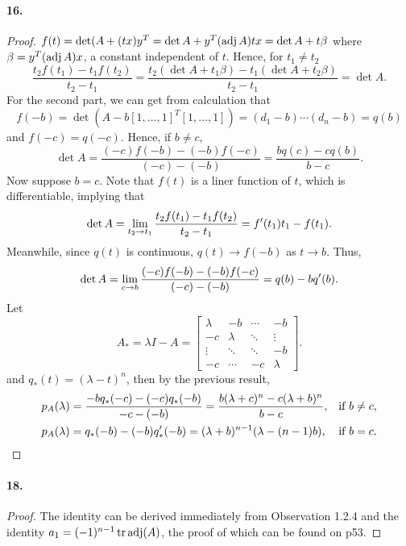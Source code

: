   \paragraph{16.}
  \begin{proof}
    $f(t)=\det(A+(tx)y^T = \det A + y^T(\operatorname{adj} A)tx = \det A + t\beta$ where 
    $\beta = y^T(\operatorname{adj} A)x$, a constant independent of $t$. Hence, for $t_1\ne
    t_2$
    \[
      \frac{t_2f(t_1)-t_1f(t_2)}{t_2-t_1} 
      = \frac{t_2(\det A + t_1\beta) - t_1(\det A + t_2\beta)}{t_2-t_1}
      = \det A.
    \]
    For the second part, we can get from calculation that
    \[
      f(-b)=\det(A-b[1,\dots,1]^T[1,\dots,1]) = (d_1-b)\cdots(d_n-b)=q(b)
    \]
    and $f(-c)=q(-c)$. Hence, if $b\ne c$,
    \[
      \det A = \frac{(-c)f(-b)- (-b)f(-c)}{(-c)-(-b)}=\frac{bq(c)-cq(b)}{b-c}.
    \]
    Now suppose $b=c$. Note that $f(t)$ is a liner function of $t$, which is 
    differentiable, implying that 
    \[
      \det A = \lim_{t_2\to t_1}\frac{t_2f(t_1)-t_1f(t_2)}{t_2-t_1} 
      = f^\prime(t_1)t_1 - f(t_1).
    \]
    Meanwhile, since $q(t)$ is continuous, $q(t)\to f(-b)$ as $t\to b$. Thus,
    \[
      \det A = \lim_{c\to b}\frac{(-c)f(-b)- (-b)f(-c)}{(-c)-(-b)}
      = q(b) - bq^\prime(b).
    \]
    Let 
    \[
      A_* = \lambda I - A = 
      \begin{bmatrix}
        \lambda & -b      & \cdots & -b \\
        -c      & \lambda & \ddots & \vdots \\
        \vdots  & \ddots  & \ddots & -b \\
        -c      & \cdots  & -c     & \lambda 
      \end{bmatrix}.
    \]
    and $q_*(t)=(\lambda - t)^n$, then by the previous result,
    \begin{align*}
      p_A(\lambda) &= \frac{-bq_*(-c) - (-c)q_*(-b)}{-c-(-b)} 
                    = \frac{b(\lambda+c)^n - c(\lambda+b)^n}{b-c}, 
                      & \text{if } b\ne c, \\ 
      p_A(\lambda) &= q_*(-b)-(-b)q_*^\prime(-b) 
                    = (\lambda+b)^{n-1}(\lambda-(n-1)b),
                      & \text{if } b=c. 
    \end{align*}
  \end{proof}

  \paragraph{18.}
  \begin{proof}
    The identity can be derived immediately from Observation 1.2.4 and the 
    identity $a_1 = (-1)^{n-1}\operatorname{tr}\operatorname{adj}(A)$, the proof of which can be found on 
    p53.
  \end{proof}

